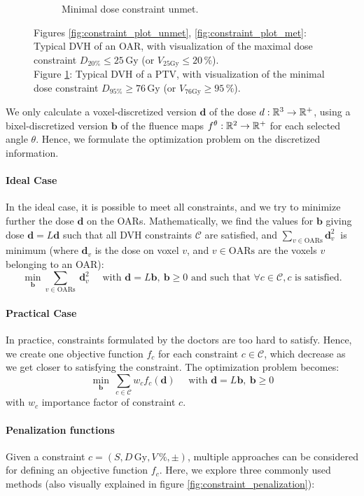 \begin{figure}
\begin{subfigure}{0.32\textwidth}
		\caption{Minimal dose constraint unmet.}
		\label{fig:constraint_plot_min}
	\end{subfigure}
	\caption*{
		Figures \ref{fig:constraint_plot_unmet}, \ref{fig:constraint_plot_met}:
		Typical DVH of an OAR, with visualization of the maximal dose constraint $D_{20\%} \leq 25\,\text{Gy}$ (or $V_{25\text{Gy}} \leq 20\,\%$).\\
		Figure \ref{fig:constraint_plot_min}:
		Typical DVH of a PTV, with visualization of the minimal dose constraint $D_{95\%} \geq 76\,\text{Gy}$ (or $V_{76\text{Gy}} \geq 95\,\%$).
	}
	\label{fig:constraint_plot}
\end{figure}

We only calculate a voxel-discretized version $\mathbf{d}$ of the dose $d: \mathbb{R}^3 \to \mathbb{R}^+$, using a bixel-discretized version $\mathbf{b}$ of the fluence maps $f^\theta: \mathbb{R}^2 \to \mathbb{R}^+$ for each selected angle $\theta$.
Hence, we formulate the optimization problem on the discretized information.

\paragraph{Ideal Case}
In the ideal case, it is possible to meet all constraints, and we try to minimize further the dose $\mathbf{d}$ on the OARs.
Mathematically, we find the values for $\mathbf{b}$ giving dose $\mathbf{d} = L\mathbf{d}$ such that all DVH constraints $\mathcal{C}$ are satisfied, and $\sum_{v \in \text{OARs}} \mathbf{d}_v^2 \ $ is minimum (where $\mathbf{d}_v$ is the dose on voxel $v$, and $v \in \text{OARs}$ are the voxels $v$ belonging to an OAR):
$$
\min_{\mathbf{b}} \sum_{v \in \text{OARs}} \ \mathbf{d}_v^2
\quad \text{ with }
\mathbf{d} = L\mathbf{b}, \ \mathbf{b} \geq 0
\text{ and such that }
\forall c \in \mathcal{C}, c \text{ is satisfied.}
$$

\paragraph{Practical Case}
In practice, constraints formulated by the doctors are too hard to satisfy.
Hence, we create one objective function $f_c$ for each constraint $c \in \mathcal{C}$, which decrease as we get closer to satisfying the constraint.
The optimization problem becomes:
$$
\min_{\mathbf{b}} \ \sum_{c \in \mathcal{C}} w_c f_c(\mathbf{d})
\quad \text{ with }
\mathbf{d} = L\mathbf{b}, \ \mathbf{b} \geq 0
$$
with $w_c$ importance factor of constraint $c$.

\paragraph{Penalization functions}
Given a constraint $c = \left( S, D\,\text{Gy}, V\,\%, \pm \right)$, multiple approaches can be considered for defining an objective function \( f_c \).
Here, we explore three commonly used methods (also visually explained in figure \ref{fig:constraint_penalization}):

